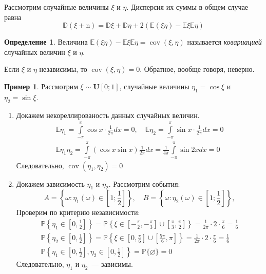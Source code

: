 \documentclass[oneside,final,14pt]{extreport}
\theoremstyle{plain}
\theoremstyle{definition}
\newtheorem*{defn}{Определение}
\newtheorem*{exmp}{Пример}
\theoremstyle{named}
\begin{document}
Рассмотрим случайные величины $\xi$ и $\eta$. Дисперсия их суммы в общем случае равна
\begin{equation*}
    \mathbb{D}(\xi+\mathrm{n})=\mathbb{D} \xi+\mathbb{D} \eta+2(\mathbb{E}(\xi \eta)-\mathbb{E} \xi \mathbb{E} \eta)
\end{equation*}
\begin{defn}
    Величина $\mathbb{E}(\xi \eta)-\mathbb{E} \xi \mathbb{E} \eta = \operatorname{cov}(\xi, \eta)$ называется {\it ковариацией} случайных величин $\xi$ и $\eta$.
\end{defn}
Если $\xi$ и $\eta$ независимы, то $\operatorname{cov}(\xi, \eta) = 0$. Обратное, вообще говоря, неверно.
\begin{exmp}
    Рассмотрим $\xi \sim \mathbf{U}[0;1]$, случайные величины $\eta_{1}=\cos \xi$ и $\eta_{2}=\sin \xi$.
    \begin{enumerate}
        \item Докажем некореллированость данных случайных величин.
        \begin{gather*}
            \mathbb{E} \eta_{1}=\int\limits_{-\pi}^{\pi} \cos x \cdot \frac{1}{2 \pi} d x=0, \quad \mathbb{E} \eta_{2}=\int\limits_{-\pi}^{\pi} \sin x \cdot \frac{1}{2 \pi} d x=0 \\
            \mathbb{E} \eta_{1} \eta_{2}=\int\limits_{-\pi}^{\pi}(\cos x \sin x) \frac{1}{2 \pi} d x=\frac{1}{4 \pi} \int\limits_{-\pi}^{\pi} \sin 2 x d x=0
        \end{gather*}
        Следовательно, $\operatorname{cov}(\eta_1, \eta_2) = 0$
        \item Докажем зависимость $\eta_1$ и $\eta_2$. Рассмотрим события:
        \begin{equation*}
            A = \left\{\omega \colon \eta_1(\omega) \in \left[1;\frac{1}{2} \right] \right\}, \quad
            B = \left\{\omega \colon \eta_2(\omega) \in \left[1;\frac{1}{2} \right] \right\},
        \end{equation*}
        Проверим по критерию независимости:
        \begin{gather*}
            \mathbb{P}\left\{\eta_{1} \in\left[0, \frac{1}{2}\right]\right\}=\mathbb{P}\left\{\xi \in\left[-\frac{\pi}{2},-\frac{\pi}{3}\right] \cup\left[\frac{\pi}{3}, \frac{\pi}{2}\right]\right\}=\frac{1}{2 \pi} \cdot 2 \cdot \frac{\pi}{6}=\frac{1}{6} \\
            \mathbb{P}\left\{\eta_{2} \in\left[0, \frac{1}{2}\right]\right\}=\mathbb{P}\left\{\xi \in\left[0, \frac{\pi}{6}\right] \cup\left[\frac{5 \pi}{6}, \pi\right]\right\}=\frac{1}{2 \pi} \cdot 2 \cdot \frac{\pi}{6}=\frac{1}{6} \\
            \mathbb{P}\left\{\eta_{1} \in\left[0, \frac{1}{2}\right], \eta_{2} \in\left[0, \frac{1}{2}\right]\right\}=\mathbb{P}\{\varnothing\}=0
        \end{gather*}
        Следовательно, $\eta_1$ и $\eta_2$~--- зависимы.
    \end{enumerate}
\end{exmp}
\end{document}
